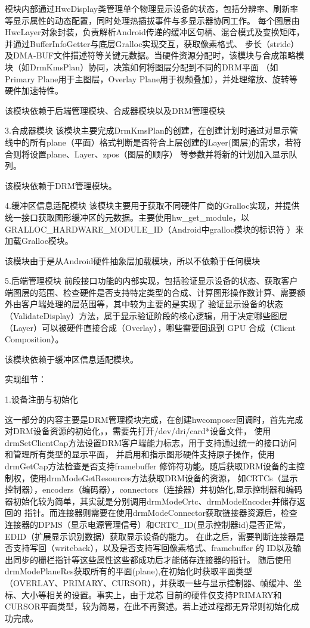 模块内部通过HwcDisplay类管理单个物理显示设备的状态，包括分辨率、刷新率等显示属性的动态配置，同时处理热插拔事件与多显示器协同工作。
每个图层由HwcLayer对象封装，负责解析Android传递的缓冲区句柄、混合模式及变换矩阵，并通过BufferInfoGetter与底层Gralloc实现交互，获取像素格式、
步长（stride）及DMA-BUF文件描述符等关键元数据。当硬件资源分配时，该模块与合成策略模块（如DrmKmsPlan）协同，决策如何将图层分配到不同的DRM平面
（如Primary Plane用于主图层，Overlay Plane用于视频叠加），并处理缩放、旋转等硬件加速特性。

该模块依赖于后端管理模块、合成器模块以及DRM管理模块

3.合成器模块
该模块主要完成DrmKmsPlan的创建，在创建计划时通过对显示管线中的所有plane（平面）格式判断是否符合上层创建的Layer(图层)的需求，若符合则将设置plane、Layer、zpos（图层的顺序）
等参数并将新的计划加入显示队列。

该模块依赖于DRM管理模块。

4.缓冲区信息适配模块
该模块主要用于获取不同硬件厂商的Gralloc实现，并提供统一接口获取图形缓冲区的元数据。主要使用hw\_get\_module，以GRALLOC\_HARDWARE\_MODULE\_ID（Android中gralloc模块的标识符
）来加载Gralloc模块。

该模块由于是从Android硬件抽象层加载模块，所以不依赖于任何模块

5.后端管理模块
前段接口功能的内部实现，包括验证显示设备的状态、获取客户端图层的范围、检查硬件是否支持特定类型的合成、计算图形操作数计算、需要额外由客户端处理的层范围等，其中较为主要的是实现了
验证显示设备的状态（ValidateDisplay）方法，属于显示验证阶段的核心逻辑，用于决定哪些图层（Layer）可以被硬件直接合成（Overlay），哪些需要回退到 GPU 合成（Client Composition）。

该模块依赖于缓冲区信息适配模块。

实现细节：

1.设备注册与初始化

这一部分的内容主要是DRM管理模块完成，在创建hwcomposer回调时，首先完成对DRM设备资源的初始化，，需要先打开/dev/dri/card*设备文件，
使用drmSetClientCap方法设置DRM客户端能力标志，用于支持通过统一的接口访问和管理所有类型的显示平面，
并启用和指示图形硬件支持原子操作，使用drmGetCap方法检查是否支持framebuffer 修饰符功能。随后获取DRM设备的主控制权，使用drmModeGetResources方法获取DRM设备的资源，
如CRTCs（显示控制器），encoders（编码器），connectors（连接器）并初始化,显示控制器和编码器初始化较为简单，其实就是分别调用drmModeCrtc、drmModeEncoder并储存返回的
指针。而连接器则需要在使用drmModeConnector获取链接器资源后，检查连接器的DPMS（显示电源管理信号）和CRTC\_ID(显示控制器id)是否正常，EDID（扩展显示识别数据）获取显示设备的能力。
在此之后，需要判断连接器是否支持写回（writeback），以及是否支持写回像素格式、framebuffer 的 ID以及输出同步的栅栏指针等这些属性这些都成功后才能储存连接器的指针。
随后使用drmModePlaneRes获取所有的平面(plane),在初始化时获取平面类型（OVERLAY、PRIMARY、CURSOR），并获取一些与显示控制器、帧缓冲、坐标、大小等相关的设置。事实上，由于龙芯
目前的硬件仅支持PRIMARY和CURSOR平面类型，较为简易，在此不再赘述。若上述过程都无异常则初始化成功完成。


